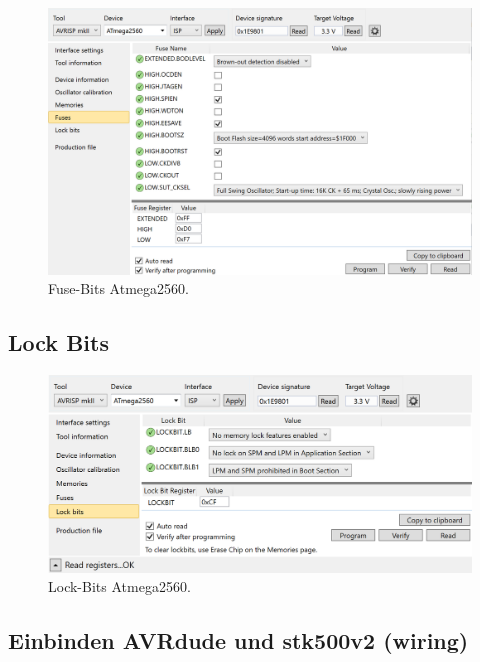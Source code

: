 \begin{appendix}
\begin{figure}[h!]
	\centering
	\includegraphics[width=\textwidth]{graphics/AtmelStudio_Fuses}
	\caption{Fuse-Bits Atmega2560.}
	\label{fig:AtmelStudio_Fuses}
\end{figure}

\subsection{Lock Bits}

\begin{figure}[h!]
	\centering
	\includegraphics[width=\textwidth]{graphics/AtmelStudio_Locks}
	\caption{Lock-Bits Atmega2560.}
	\label{fig:AtmelStudio_Locks}
\end{figure}
\newpage
\subsection{Einbinden AVRdude und stk500v2 (wiring)}


\end{appendix}
